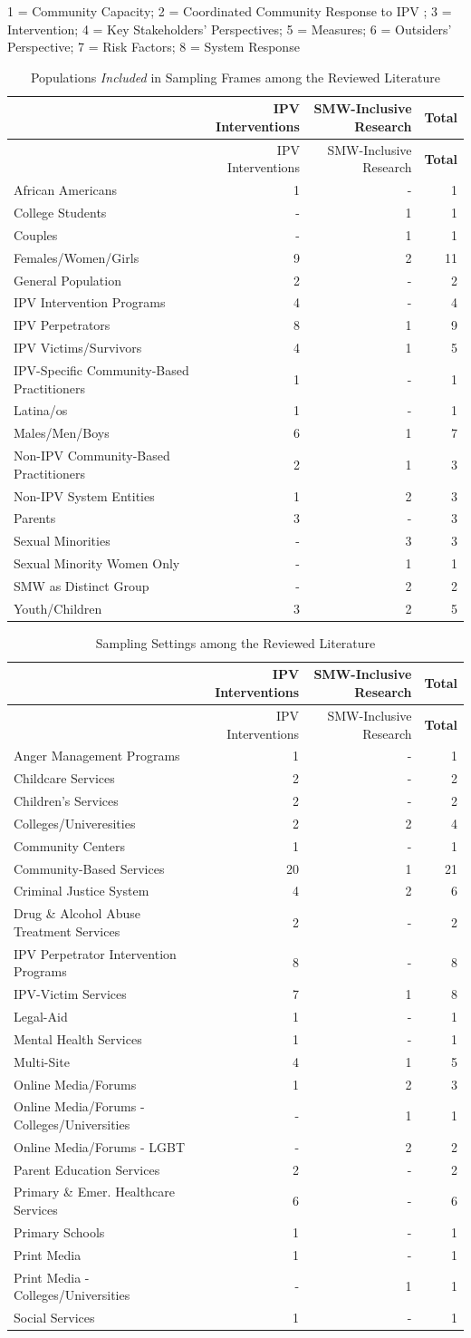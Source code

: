 \documentclass[11pt,]{tufte-book}
\begin{document}
1 = Community Capacity; 2 = Coordinated Community Response to IPV ; 3 =
Intervention; 4 = Key Stakeholders' Perspectives; 5 = Measures; 6 =
Outsiders' Perspective; 7 = Risk Factors; 8 = System Response

\newpage

\begin{longtable}[]{@{}lrrr@{}}
\caption{Populations \emph{Included} in Sampling Frames among the
Reviewed Literature \label{tbl:ftmpopp}}\tabularnewline
\toprule
& IPV Interventions & SMW-Inclusive Research &
\textbf{Total}\tabularnewline
\midrule
\endfirsthead
\toprule
& IPV Interventions & SMW-Inclusive Research &
\textbf{Total}\tabularnewline
\midrule
\endhead
African Americans & 1 & - & 1\tabularnewline
College Students & - & 1 & 1\tabularnewline
Couples & - & 1 & 1\tabularnewline
Females/Women/Girls & 9 & 2 & 11\tabularnewline
General Population & 2 & - & 2\tabularnewline
IPV Intervention Programs & 4 & - & 4\tabularnewline
IPV Perpetrators & 8 & 1 & 9\tabularnewline
IPV Victims/Survivors & 4 & 1 & 5\tabularnewline
IPV-Specific Community-Based Practitioners & 1 & - & 1\tabularnewline
Latina/os & 1 & - & 1\tabularnewline
Males/Men/Boys & 6 & 1 & 7\tabularnewline
Non-IPV Community-Based Practitioners & 2 & 1 & 3\tabularnewline
Non-IPV System Entities & 1 & 2 & 3\tabularnewline
Parents & 3 & - & 3\tabularnewline
Sexual Minorities & - & 3 & 3\tabularnewline
Sexual Minority Women Only & - & 1 & 1\tabularnewline
SMW as Distinct Group & - & 2 & 2\tabularnewline
Youth/Children & 3 & 2 & 5\tabularnewline
\bottomrule
\end{longtable}

\newpage

\begin{longtable}[]{@{}lrrr@{}}
\caption{Sampling Settings among the Reviewed Literature
\label{tbl:ftmsetp}}\tabularnewline
\toprule
& IPV Interventions & SMW-Inclusive Research &
\textbf{Total}\tabularnewline
\midrule
\endfirsthead
\toprule
& IPV Interventions & SMW-Inclusive Research &
\textbf{Total}\tabularnewline
\midrule
\endhead
Anger Management Programs & 1 & - & 1\tabularnewline
Childcare Services & 2 & - & 2\tabularnewline
Children's Services & 2 & - & 2\tabularnewline
Colleges/Univeresities & 2 & 2 & 4\tabularnewline
Community Centers & 1 & - & 1\tabularnewline
Community-Based Services & 20 & 1 & 21\tabularnewline
Criminal Justice System & 4 & 2 & 6\tabularnewline
Drug \& Alcohol Abuse Treatment Services & 2 & - & 2\tabularnewline
IPV Perpetrator Intervention Programs & 8 & - & 8\tabularnewline
IPV-Victim Services & 7 & 1 & 8\tabularnewline
Legal-Aid & 1 & - & 1\tabularnewline
Mental Health Services & 1 & - & 1\tabularnewline
Multi-Site & 4 & 1 & 5\tabularnewline
Online Media/Forums & 1 & 2 & 3\tabularnewline
Online Media/Forums - Colleges/Universities & - & 1 & 1\tabularnewline
Online Media/Forums - LGBT & - & 2 & 2\tabularnewline
Parent Education Services & 2 & - & 2\tabularnewline
Primary \& Emer. Healthcare Services & 6 & - & 6\tabularnewline
Primary Schools & 1 & - & 1\tabularnewline
Print Media & 1 & - & 1\tabularnewline
Print Media - Colleges/Universities & - & 1 & 1\tabularnewline
Social Services & 1 & - & 1\tabularnewline
\bottomrule
\end{longtable}
\end{document}
